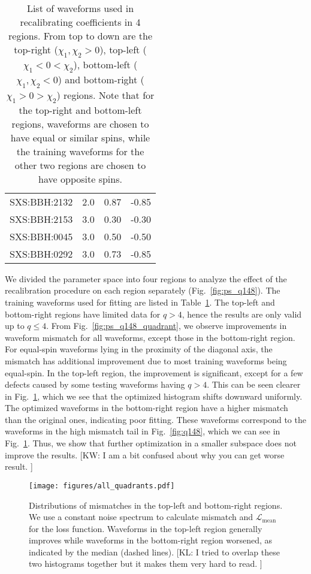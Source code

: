 \documentclass[twocolumn]{aastex631}
\newcommand{\kw}[1]{{\color{rb4}[KW: #1 ]}}
\newcommand{\kl}[1]{{\color{cyan}[KL: #1 ]}}
\begin{document}
\begin{table}[t]
\begin{tabularx}{0.8\columnwidth}{@{\extracolsep{\fill}}lrrr}
		SXS:BBH:2132 & 2.0 & 0.87     & -0.85    \\
		SXS:BBH:2153 & 3.0 & 0.30     & -0.30    \\
		SXS:BBH:0045 & 3.0 & 0.50     & -0.50    \\
		SXS:BBH:0292 & 3.0 & 0.73     & -0.85    \\ \midrule\bottomrule
	\end{tabularx}
	\caption{List of waveforms used in recalibrating coefficients in 4 regions. From top to down are the top-right ($\chi_1,\chi_2>0$), top-left ($\chi_1<0<\chi_2$), bottom-left ($\chi_1,\chi_2<0$) and bottom-right ($\chi_1>0>\chi_2$) regions. Note that for the top-right and bottom-left regions, waveforms are chosen to have equal or similar spins, while the training waveforms for the other two regions are chosen to have opposite spins.}
	\label{tab:quadrants}
\end{table}

We divided the parameter space into four regions to analyze the effect of the
recalibration procedure on each region separately (Fig.~\ref{fig:ps_q148}). The
training waveforms used for fitting are listed in Table~\ref{tab:quadrants}. The
top-left and bottom-right regions have limited data for $q>4$, hence the results are
only valid up to $q\leq4$. From Fig.~\ref{fig:ps_q148_quadrant}, we observe
improvements in waveform mismatch for all waveforms, except those in the bottom-right 
region. For equal-spin waveforms lying in the proximity of the diagonal axis,
the mismatch has additional improvement due to most training waveforms being
equal-spin. In the top-left region, the improvement is significant, except for a
few defects caused by some testing waveforms having $q>4$. This can be seen clearer in 
Fig.~\ref{fig:all_quadrants}, which we see that the optimized histogram shifts downward uniformly. 
The optimized waveforms in the bottom-right region have a higher mismatch than the original ones,
indicating poor fitting. These waveforms correspond to the waveforms in the high mismatch tail 
in Fig.~\ref{fig:q148}, which we can see in Fig.~\ref{fig:all_quadrants}. Thus, we show that 
further optimization in a smaller subspace does not improve the results. \kw{I am a bit confused about why you can get worse result.}

\begin{figure}[t]
	\centering
	\texttt{[image: figures/all\_quadrants.pdf]}
	\caption{Distributions of mismatches in the top-left and bottom-right regions.
	We use a constant noise spectrum to calculate mismatch and
	$\mathcal{L}_{\mathrm{mean}}$ for the loss function. Waveforms in the top-left region generally improves while waveforms in the bottom-right region worsened, as indicated by the median (dashed lines). \kl{I tried to overlap these two histograms together but it makes them very hard to read. }}
	\label{fig:all_quadrants}
\end{figure}
\end{document}
